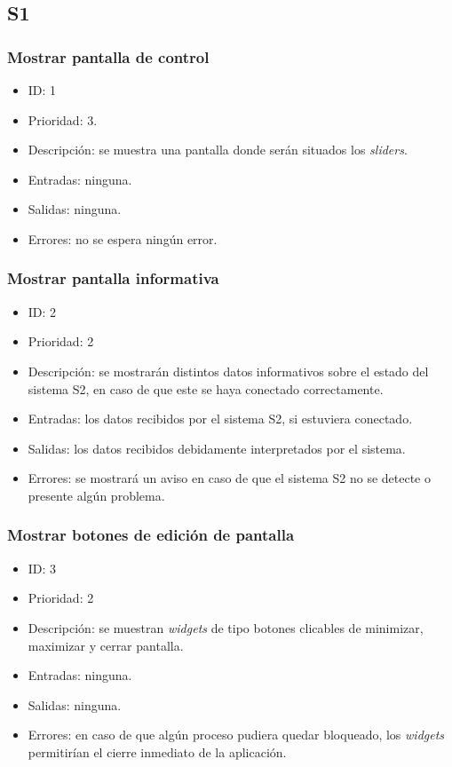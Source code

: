 \subsection*{\ac{S1}}
\subsubsection{Mostrar pantalla de control}
\begin{itemize}
    \item ID: 1
    \item Prioridad: 3.
    \item Descripción: se muestra una pantalla donde serán situados los \textit{sliders}.
    \item Entradas: ninguna.
    \item Salidas: ninguna.
    \item Errores: no se espera ningún error.
\end{itemize}

\subsubsection{Mostrar pantalla informativa}
\begin{itemize}
    \item ID: 2
    \item Prioridad: 2
    \item Descripción: se mostrarán distintos datos informativos sobre el estado del sistema \ac{S2}, en caso de que este se haya conectado correctamente.
    \item Entradas: los datos recibidos por el sistema \ac{S2}, si estuviera conectado.
    \item Salidas: los datos recibidos debidamente interpretados por el sistema.
    \item Errores: se mostrará un aviso en caso de que el sistema \ac{S2} no se detecte o presente algún problema.
\end{itemize}

\subsubsection{Mostrar botones de edición de pantalla}
\begin{itemize}
    \item ID: 3
    \item Prioridad: 2
    \item Descripción: se muestran \textit{widgets} de tipo botones clicables de minimizar, maximizar y cerrar pantalla.
    \item Entradas: ninguna.
    \item Salidas: ninguna.
    \item Errores: en caso de que algún proceso pudiera quedar bloqueado, los \textit{widgets} permitirían el cierre inmediato de la aplicación.
\end{itemize}

